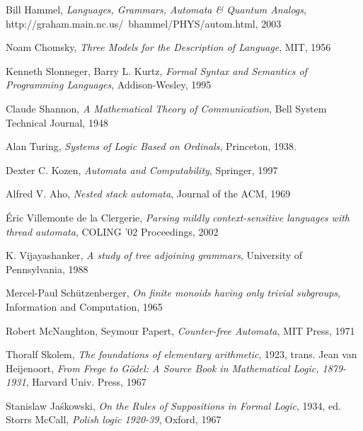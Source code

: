 \documentclass{article}
\begin{document}
\begin{thebibliography}{99}

    Bill Hammel,
    \emph{Languages, Grammars, Automata \& Quantum Analogs},
    http://graham.main.nc.us/~bhammel/PHYS/autom.html,
    2003

    Noam Chomsky,
    \emph{Three Models for the Description of Language},
    MIT,
    1956

    Kenneth Slonneger, Barry L. Kurtz,
    \emph{Formal Syntax and Semantics of Programming Languages},
    Addison-Wesley,
    1995

    Claude Shannon,
    \emph{A Mathematical Theory of Communication},
    Bell System Technical Journal,
    1948

    Alan Turing,
    \emph{Systems of Logic Based on Ordinals},
    Princeton,
    1938.

    Dexter C. Kozen,
    \emph{Automata and Computability},
    Springer,
    1997

    Alfred V. Aho,
    \emph{Nested stack automata},
    Journal of the ACM,
    1969

    \'Eric Villemonte de la Clergerie,
    \emph{Parsing mildly context-sensitive languages with thread automata},
    COLING '02 Proceedings,
    2002

    K. Vijayashanker,
    \emph{A study of tree adjoining grammars},
    University of Pennsylvania,
    1988

    Mercel-Paul Sch\"utzenberger,
    \emph{On finite monoids having only trivial subgroups},
    Information and Computation,
    1965

    Robert McNaughton, Seymour Papert,
    \emph{Counter-free Automata},
    MIT Press,
    1971

    Thoralf Skolem,
    \emph{The foundations of elementary arithmetic},
    1923,
    trans. Jean van Heijenoort,
    \emph{From Frege to G\"odel: A Source Book in Mathematical Logic, 1879-1931},
    Harvard Univ. Press,
    1967

    Stanislaw Ja\'skowski,
    \emph{On the Rules of Suppositions in Formal Logic},
    1934,
    ed. Storrs McCall,
    \emph{Polish logic 1920-39},
    Oxford,
    1967


\end{thebibliography}
\end{document}
